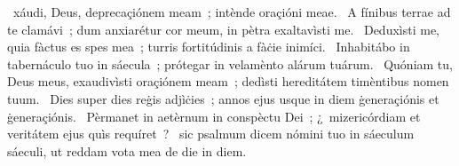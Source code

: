 \psalmChapterWithInscription{}
{ }
{%
~xáudi, Deus, deprecaçiónem meam~; intènde oraçióni meae. 
~A fínibus terrae ad te clamávi~; dum anxiarétur cor meum, in pètra exaltavìsti me. 
~Deduxìsti me, quia fàctus es spes mea~; turris fortitúdinis a fàċie inimíci. 
~Inhabitábo in tabernáculo tuo in sáecula~; prótegar in velamènto alárum tuárum. 
~Quóniam tu, Deus meus, exaudivìsti oraçiónem meam~; dedìsti hereditátem timèntibus nomen tuum. 
~Dies super dies reġis adjìċies~; annos ejus usque in diem ġeneraçiónis et ġeneraçiónis. 
~Pèrmanet in aetèrnum in conspèctu Dei~; ¿~mizericórdiam et veritátem ejus quìs requíret~? 
~sic psalmum dicem nómini tuo in sáeculum sáeculi, ut reddam vota mea de die in diem. 
}
